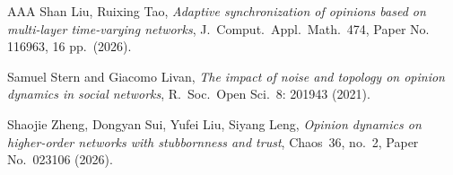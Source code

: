 \documentclass[12pt]{article}
\newcommand{\1}{\mathbf{1}}
\begin{document}
\begin{thebibliography}{AAA}
Shan Liu, Ruixing Tao, \emph{Adaptive synchronization of opinions based on multi-layer time-varying networks}, J.\ Comput.\ Appl.\ Math.~{474}, Paper No. 116963, 16 pp.\  (2026).

 Samuel Stern and Giacomo Livan, \emph{The impact of noise and topology on opinion dynamics in social networks}, R.~Soc.~Open Sci.~{8}: 201943 (2021).

 Shaojie Zheng,  Dongyan Sui, Yufei Liu,  Siyang Leng, \emph{Opinion dynamics on higher-order networks with stubbornness and trust}, Chaos~{36}, no.~2, Paper No.~023106  (2026).

\end{thebibliography}
\end{document}
